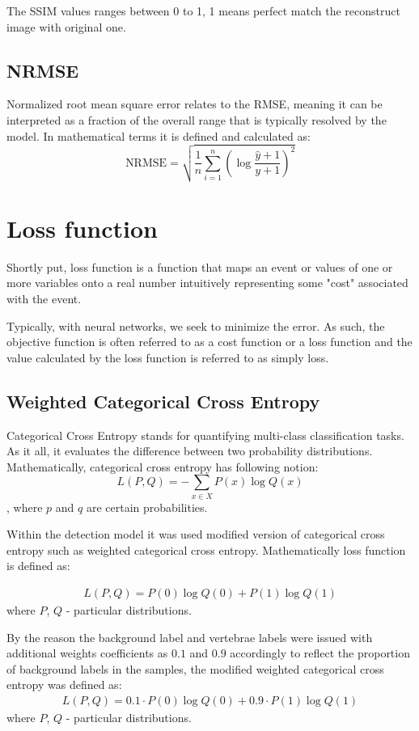 The SSIM values ranges between 0 to 1, 1 means perfect match the reconstruct image with original one.

\subsection{NRMSE}
Normalized root mean square error relates to the RMSE, meaning it can be interpreted as a fraction of the overall range that is typically resolved by the model. In mathematical terms it is defined and calculated as:
\[ \text{NRMSE} = \sqrt{\frac{1}{n} \sum_{i=1}^n\left(\log \frac{\hat{y}+1}{y+1}\right)^2} \]


\section{Loss function}
Shortly put, loss function is a function that maps an event or values of one or more variables onto a real number intuitively representing some "cost" associated with the event. 

Typically, with neural networks, we seek to minimize the error. As such, the objective function is often referred to as a cost function or a loss function and the value calculated by the loss function is referred to as simply loss.

\subsection{Weighted Categorical Cross Entropy}
Categorical Cross Entropy stands for quantifying multi-class classification tasks. As it all, it evaluates the difference between two probability distributions. Mathematically, categorical cross entropy has following notion: 
\[
L(P, Q) = - \sum_{x \in X} P(x) \log Q(x) \], where $p$ and $q$ are certain probabilities. 

Within the detection model it was used modified version of categorical cross entropy such as weighted categorical cross entropy. Mathematically loss function is defined as:

\begin{align*}
 L(P, Q) = P(0)\log Q(0) + P(1)\log Q(1)
\end{align*}
where $P$, $Q$ - particular distributions. 

By the reason the background label and vertebrae labels were issued with additional weights coefficients as $0.1$ and $0.9$ accordingly to reflect the proportion of background labels in the samples, the modified weighted categorical cross entropy was defined as:
\begin{align*}
 L(P, Q) = 0.1 \cdot P(0)\log Q(0) + 0.9 \cdot P(1)\log Q(1)
\end{align*}
where $P$, $Q$ - particular distributions.  

